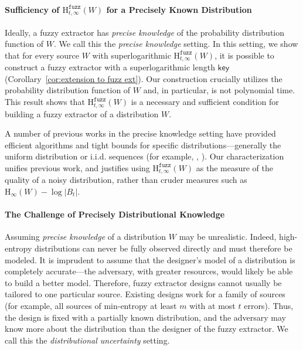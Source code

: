\documentclass[11pt]{article}
\newcommand{\corref}[1]{\mbox{Corollary~\ref{#1}}}
\newcommand{\class}[1]{{\ensuremath{\mathsf{#1}}}}
\newcommand{\key}{\ensuremath{\class{key}}\xspace}
\newcommand{\Hoo}{\mathrm{H}_\infty}
\newcommand{\Hfuzz}{\mathrm{H}^{\mathtt{fuzz}}_{t,\infty}}
\begin{document}
\paragraph{Sufficiency of $\Hfuzz(W)$ for a Precisely Known Distribution}
Ideally, a fuzzy extractor has \emph{precise knowledge} of the probability distribution function of $W$.  We call this  the \emph{precise knowledge} setting.  In this setting, we show that for every source $W$ with superlogarithmic $\Hfuzz(W)$, it is possible to construct a fuzzy extractor with a superlogarithmic length $\key$ (\corref{cor:extension to fuzz ext}). Our construction crucially utilizes the probability distribution function of $W$ and, in particular, is not polynomial time.  This result shows that $\Hfuzz(W)$ is a necessary and sufficient condition for building a fuzzy extractor of a distribution $W$.  

A number of previous works in the precise knowledge setting have provided efficient algorithms and
tight bounds for specific distributions---generally the uniform distribution or
i.i.d. sequences (for example, \cite{JW99,LT03,DBLP:conf/eccv/TuylsG04,hao2006combining}, \cite{DBLP:journals/corr/abs-1112-5630,IgnatenkoW2012}). 
Our characterization unifies previous work, and justifies using $\Hfuzz(W)$ as the measure of the quality of a noisy distribution,  rather than cruder measures such as $\Hoo(W)-\log |B_t|$. 

\paragraph{The Challenge of Precisely Distributional Knowledge}
Assuming \emph{precise knowledge} of a distribution $W$ may be unrealistic. Indeed, high-entropy distributions can never be fully observed directly and must therefore be modeled. It is imprudent to assume that the designer's model of a distribution is completely accurate---the adversary, with greater resources, would likely be able to build a better model. Therefore, fuzzy extractor designs cannot usually be tailored to one  particular source. Existing designs work for a family of sources (for example, all sources of min-entropy at least $m$ with at most $t$ errors). Thus, the design is fixed with a partially known distribution, and the adversary may know more about the distribution than the designer of the fuzzy extractor.  We call this the \emph{distributional uncertainty} setting.
\end{document}
